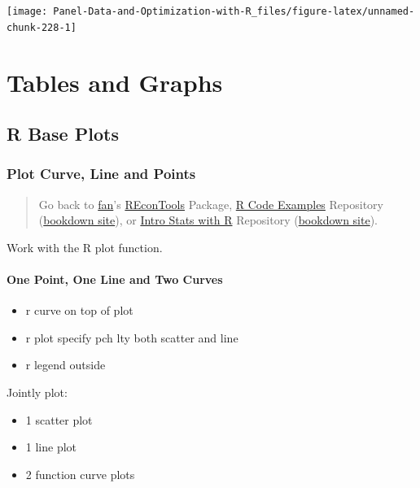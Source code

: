 \documentclass[
]{book}
\providecommand{\tightlist}{%
  \setlength{\itemsep}{0pt}\setlength{\parskip}{0pt}}
\begin{document}
\begin{center}\texttt{[image: Panel-Data-and-Optimization-with-R\_files/figure-latex/unnamed-chunk-228-1]} \end{center}

\hypertarget{tables-and-graphs}{%
\chapter{Tables and Graphs}\label{tables-and-graphs}}

\hypertarget{r-base-plots}{%
\section{R Base Plots}\label{r-base-plots}}

\hypertarget{plot-curve-line-and-points}{%
\subsection{Plot Curve, Line and Points}\label{plot-curve-line-and-points}}

\begin{quote}
Go back to \href{http://fanwangecon.github.io/}{fan}'s \href{https://fanwangecon.github.io/REconTools/}{REconTools} Package, \href{https://fanwangecon.github.io/R4Econ/}{R Code Examples} Repository (\href{https://fanwangecon.github.io/R4Econ/bookdown}{bookdown site}), or \href{https://fanwangecon.github.io/Stat4Econ/}{Intro Stats with R} Repository (\href{https://fanwangecon.github.io/Stat4Econ/bookdown}{bookdown site}).
\end{quote}

Work with the R plot function.

\hypertarget{one-point-one-line-and-two-curves}{%
\subsubsection{One Point, One Line and Two Curves}\label{one-point-one-line-and-two-curves}}

\begin{itemize}
\tightlist
\item
  r curve on top of plot
\item
  r plot specify pch lty both scatter and line
\item
  r legend outside
\end{itemize}

Jointly plot:

\begin{itemize}
\tightlist
\item
  1 scatter plot
\item
  1 line plot
\item
  2 function curve plots
\end{itemize}
\end{document}
